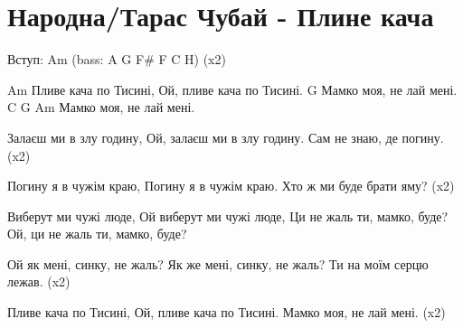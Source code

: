 \section{Народна/Тарас Чубай - Плине кача}
\begin{guitar}

Вступ: Am (bass: A G F\# F C H)  (x2)

Am
   Пливе кача по Тисині,
   Ой, пливе кача по Тисині.
                      G
   Мамко моя, не лай мені.
    C      G   Am
   Мамко моя, не лай мені.

Залаєш ми в злу годину,
Ой, залаєш ми в злу годину.
Сам не знаю, де погину.   (x2)

Погину я в чужім краю,
Погину я в чужім краю.
Хто ж ми буде брати яму?  (x2)

Виберут ми чужі люде,
Ой виберут ми чужі люде,
Ци не жаль ти, мамко, буде?
Ой, ци не жаль ти, мамко, буде?

Ой як мені, синку, не жаль?
Як же мені, синку, не жаль?
Ти на моїм серцю лежав.   (x2)

Пливе кача по Тисині,
Ой, пливе кача по Тисині.
Мамко моя, не лай мені.   (x2)
\end{guitar}
